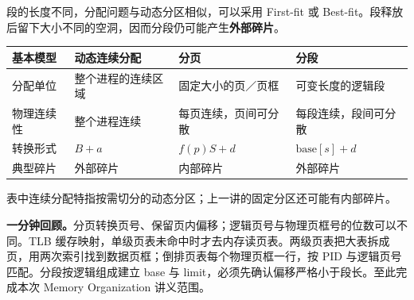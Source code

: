 段的长度不同，分配问题与动态分区相似，可以采用 First-fit 或 Best-fit。段释放后留下大小不同的空洞，因而分段仍可能产生\textbf{外部碎片}。

\begin{center}
\begin{tabularx}{\textwidth}{@{}>{\raggedright\arraybackslash}p{2.2cm}>{\raggedright\arraybackslash}X>{\raggedright\arraybackslash}X>{\raggedright\arraybackslash}X@{}}
\toprule
基本模型 & 动态连续分配 & 分页 & 分段 \\
\midrule
分配单位 & 整个进程的连续区域 & 固定大小的页／页框 & 可变长度的逻辑段 \\
物理连续性 & 整个进程连续 & 每页连续，页间可分散 & 每段连续，段间可分散 \\
转换形式 & $B+a$ & $f(p)S+d$ & $\mathrm{base}[s]+d$ \\
典型碎片 & 外部碎片 & 内部碎片 & 外部碎片 \\
\bottomrule
\end{tabularx}
\end{center}
表中连续分配特指按需切分的动态分区；上一讲的固定分区还可能有内部碎片。

\textbf{一分钟回顾。}分页转换页号、保留页内偏移；逻辑页号与物理页框号的位数可以不同。TLB 缓存映射，单级页表未命中时才去内存读页表。两级页表把大表拆成页，用两次索引找到数据页框；倒排页表每个物理页框一行，按 PID 与逻辑页号匹配。分段按逻辑组成建立 base 与 limit，必须先确认偏移严格小于段长。至此完成本次 Memory Organization 讲义范围。
\endgroup
